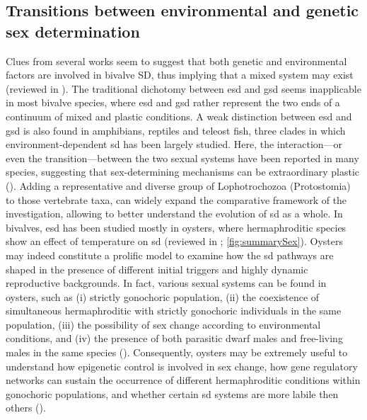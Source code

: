 \subsection{Transitions between environmental and genetic sex determination}
Clues from several works seem to suggest that both genetic and environmental factors are involved in bivalve SD, thus implying that a mixed system may exist (reviewed in ). The traditional dichotomy between \gls{esd} and \gls{gsd} seems inapplicable in most bivalve species, where \gls{esd} and \gls{gsd} rather represent the two ends of a continuum of mixed and plastic conditions.  A weak distinction between \gls{esd} and \gls{gsd} is also found in amphibians, reptiles and teleost fish, three clades in which environment-dependent \gls{sd} has been largely studied. Here, the interaction---or even the transition---between the two sexual systems have been reported in many species, suggesting that sex-determining mechanisms can be extraordinary plastic (). Adding a representative and diverse group of Lophotrochozoa (Protostomia) to those vertebrate taxa, can widely expand the comparative framework of the investigation, allowing to better understand the evolution of \gls{sd} as a whole. In bivalves, \gls{esd} has been studied mostly in oysters, where hermaphroditic species show an effect of temperature on \gls{sd} (reviewed in ; \cref{fig:summarySex}). Oysters may indeed constitute a prolific model to examine how the \gls{sd} pathways are shaped in the presence of different initial triggers and highly dynamic reproductive backgrounds. In fact, various sexual systems can be found in oysters, such as (i) strictly gonochoric population, (ii) the coexistence of simultaneous hermaphroditic with strictly gonochoric individuals in the same population, (iii) the possibility of sex change according to environmental conditions, and (iv) the presence of both parasitic dwarf males and free-living males in the same species (). Consequently, oysters may be extremely useful to understand how epigenetic control is involved in sex change, how gene regulatory networks can sustain the occurrence of different hermaphroditic conditions within gonochoric populations, and whether certain \gls{sd} systems are more labile then others ().


